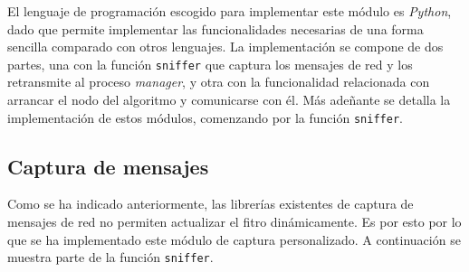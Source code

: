 El lenguaje de programación escogido para implementar este módulo es \textit{Python}\cite{python}, dado que permite implementar las funcionalidades necesarias de una forma sencilla comparado con otros lenguajes. La implementación se compone de dos partes, una con la función \texttt{sniffer} que captura los mensajes de red y los retransmite al proceso \textit{manager}, y otra con la funcionalidad relacionada con arrancar el nodo del algoritmo y comunicarse con él. Más adeñante se detalla la implementación de estos módulos, comenzando por la función \texttt{sniffer}.

\subsection{Captura de mensajes}

Como se ha indicado anteriormente, las librerías existentes de captura de mensajes de red no permiten actualizar el fitro dinámicamente. Es por esto por lo que se ha implementado este módulo de captura personalizado. A continuación se muestra parte de la función \texttt{sniffer}.

